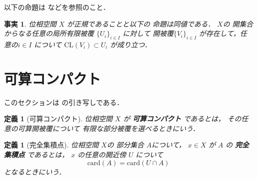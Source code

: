 \documentclass[leqno, a4paper, 12pt]{jsarticle}
\newtheorem{df}[thm]{定義}
\newtheorem{fact}[thm]{事実}
\newcommand{\card}{\mathrm{card}}
\newcommand{\cl}{\mathrm{CL}}
\begin{document}
以下の命題は
\cite{Den4}
などを参照のこと．
\begin{fact}\label{fact:normal}
位相空間
$X$
が正規であることと以下の
命題は同値である．
$X$の
開集合からなる任意の局所有限被覆
$\{U_{i}\}_{i\in I}$
に対して
開被覆$\{V_{i}\}_{i\in I}$
が存在して，任意の$i\in I$
について
$\cl(V_{i})\subset U_{i}$
が成り立つ．

\end{fact}


\section{可算コンパクト}

このセクションは
\cite{Den1}
の引き写しである．

\begin{df}[可算コンパクト]
位相空間
$X$
が
\textbf{可算コンパクト}
であるとは，
その任意の可算開被覆について
有限な部分被覆を選べるときにいう．
\end{df}

\begin{df}[完全集積点]
位相空間
$X$の
部分集合
$A$について，
$x\in X$
が
$A$
の
\textbf{完全集積点}
であるとは，
$x$
の任意の開近傍
$U$
について
\[
\card(A)=\card(U\cap A)
\]
となるときにいう．
\end{df}
\end{document}
